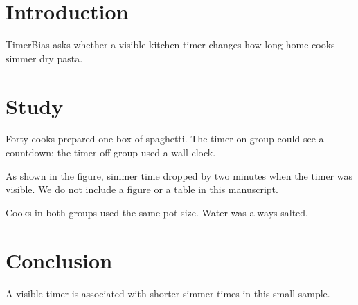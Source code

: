 \documentclass{article}
\begin{document}
\section{Introduction}

TimerBias asks whether a visible kitchen timer changes how long home cooks simmer dry pasta.

\section{Study}

Forty cooks prepared one box of spaghetti. The timer-on group could see a countdown; the timer-off group used a wall clock.

As shown in the figure, simmer time dropped by two minutes when the timer was visible. We do not include a figure or a table in this manuscript.

Cooks in both groups used the same pot size. Water was always salted.

\section{Conclusion}

A visible timer is associated with shorter simmer times in this small sample.
\end{document}
